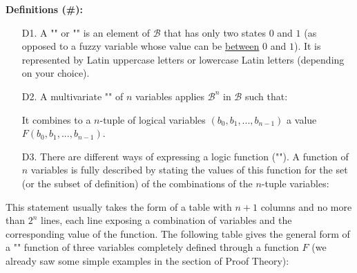 	\textbf{Definitions (\#\mydef):}
	\begin{enumerate}
		\item[D1.] A "" or "" is an element of $\mathcal{B}$ that has only two states $0$ and $1$ (as opposed to a fuzzy variable whose value can be \underline{between} $0$ and $1$). It is represented by Latin uppercase letters or lowercase Latin letters (depending on your choice).
		
		\item[D2.] A multivariate "" of $n$ variables applies $\mathcal{B}^n$ in $\mathcal{B}$ such that:
		
		It combines to a $n$-tuple of logical variables $(b_0,b_1,...,b_{n-1})$ a value $F(b_0,b_1,...,b_{n-1})$.
		
		\item[D3.] There are different ways of expressing a logic function (""). A function of $n$ variables is fully described by stating the values of this function for the set (or the subset of definition) of the combinations of the $n$-tuple variables:
		
	\end{enumerate}
	This statement usually takes the form of a table with $n + 1$ columns and no more than $2^n$ lines, each line exposing a combination of variables and the corresponding value of the function. The following table gives the general form of a "" function of three variables completely defined through a function $F$ (we already saw some simple examples in the section of Proof Theory):

